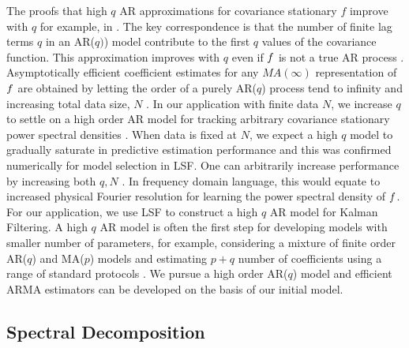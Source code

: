The proofs that high $q$ AR approximations for covariance stationary $f$ improve with $q$ for example, in \cite{wahlberg1989estimation}. The key correspondence is that the number of finite lag terms $q$ in an AR($q)$) model contribute to the first $q$ values of the covariance function. This approximation improves with $q$ even if $f$ is not a true AR process \cite{wahlberg1989estimation,west1996bayesian}. Asymptotically efficient coefficient estimates for any $MA(\infty)$ representation of $f$ are obtained by letting the order of a purely AR($q$) process tend to infinity and increasing total data size, $N$ \cite{wahlberg1989estimation}. In our application with finite data $N$, we increase $q$ to settle on a high order AR model for tracking arbitrary covariance stationary power spectral densities \cite{brockwell1996introduction}.  When data is fixed at $N$, we expect a high $q$ model to gradually saturate in predictive estimation performance and this was confirmed numerically for model selection in LSF. One can arbitrarily increase performance by increasing both $q, N$ \cite{wahlberg1989estimation}. In frequency domain language, this would equate to increased physical Fourier resolution for learning the power spectral density of $f$. For our application, we use LSF to construct a high $q$ AR model for Kalman Filtering.  A high $q$ AR model is often the first step for developing models with smaller number of parameters, for example, considering a mixture of finite order AR($q$) and MA($p$) models and estimating $p+q$ number of coefficients using a range of standard protocols \cite{brockwell1996introduction,west1996bayesian}. We pursue a high order AR($q$) model and efficient ARMA estimators can be developed on the basis of our initial model. 


\subsection{Spectral Decomposition}

